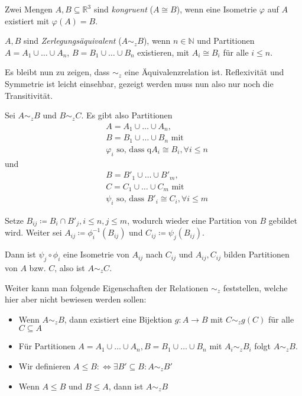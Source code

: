 \begin{definition}[Kongruenz]
	Zwei Mengen $A,B\subseteq\mathbb{R}^3$ sind \textit{kongruent} ($A\cong B$), wenn eine Isometrie $\varphi$ auf $A$ existiert mit $\varphi(A)=B$.
\end{definition}

\begin{definition}[Zerlegungsäquivalenz]
	$A, B$ sind \textit{Zerlegungsäquivalent} ($A\sim_z B$), wenn $n\in\mathbb{N}$ und Partitionen $A=A_1\cup\dots\cup A_n$, $B=B_1\cup\dots\cup B_n$ existieren, mit $A_i\cong B_i$ für alle $i\leq n$.
\end{definition}

Es bleibt nun zu zeigen, dass $\sim_z$ eine Äquivalenzrelation ist. Reflexivität und Symmetrie ist leicht einsehbar, gezeigt werden muss nun also nur noch die Transitivität.

Sei $A\sim_z B$ und $B\sim_z C$. Es gibt also Partitionen 
\begin{align*}
	&A=A_1\cup\dots\cup A_n,\\
	&B=B_1\cup\dots\cup B_n \text{ mit}\\
	&\varphi_i \text{ so, dass q} A_i\cong B_i, \forall i\leq n
\end{align*}
und 
\begin{align*}
	&B=B'_1\cup\dots\cup B'_m,\\
	&C=C_1\cup\dots\cup C_m \text{ mit}\\
	&\psi_i \text{ so, dass } B'_i\cong C_i, \forall i\leq m
\end{align*}

Setze $B_{ij}\coloneqq B_i\cap B'_j, i\leq n, j\leq m$, wodurch wieder eine Partition von $B$ gebildet wird. Weiter sei $A_{ij}\coloneqq\phi_i^{-1}(B_{ij})$ und $C_{ij}\coloneqq\psi_j(B_{ij})$.

Dann ist $\psi_j\circ\phi_i$ eine Isometrie von $A_{ij}$ nach $C_{ij}$ und $A_{ij}, C_{ij}$ bilden Partitionen von $A$ bzw. $C$, also ist $A\sim_z C$.

Weiter kann man folgende Eigenschaften der Relationen $\sim_z$ feststellen, welche hier aber nicht bewiesen werden sollen:
\begin{itemize}
	\item Wenn $A\sim_z B$, dann existiert eine Bijektion $g:A\to B$ mit $C\sim_z g(C)$ für alle $C\subseteq A$
	\item Für Partitionen $A=A_1\cup\dots\cup A_n, B=B_1\cup\dots\cup B_n$ mit $A_i\sim_z B_i$ folgt $A\sim_z B$.
	\item Wir definieren $A\leq B\colon\Leftrightarrow \exists B'\subseteq B : A\sim_z B'$
	\item Wenn $A\leq B$ und $B\leq A$, dann ist $A\sim_z B$
\end{itemize}

